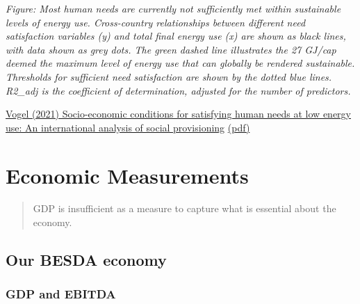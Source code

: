 \documentclass[
]{book}
\begin{document}
\emph{Figure: Most human needs are currently not sufficiently met within sustainable levels of energy use. Cross-country relationships between different need satisfaction
variables (y) and total final energy use (x) are shown as black lines, with data shown as grey dots. The green dashed line illustrates the 27 GJ/cap deemed the
maximum level of energy use that can globally be rendered sustainable. Thresholds for sufficient need satisfaction are shown by the dotted blue
lines. R2\_adj is the coefficient of determination, adjusted for the number of predictors.}

\href{https://www.sciencedirect.com/science/article/pii/S0959378021000662}{Vogel (2021) Socio-economic conditions for satisfying human needs at low energy use: An international analysis of social provisioning}
\href{pdf/Vogel_2021_Social_Provisoning_of_Needs.pdf}{(pdf)}

\hypertarget{economic-measurements}{%
\chapter{Economic Measurements}\label{economic-measurements}}

\begin{quote}
GDP is insufficient as a measure to capture what is essential about the economy.
\end{quote}

\hypertarget{our-besda-economy}{%
\section{Our BESDA economy}\label{our-besda-economy}}

\hypertarget{gdp-and-ebitda}{%
\subsection{GDP and EBITDA}\label{gdp-and-ebitda}}
\end{document}
